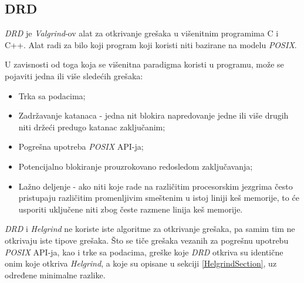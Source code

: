 \documentclass[12pt,oneside]{memoir}
\theoremstyle{plain}
\theoremstyle{definition}
\begin{document}
\subsection{DRD}
\textit{DRD} je \textit{Valgrind}-ov alat za otkrivanje grešaka u višenitnim programima C i C++. Alat radi za bilo koji program koji koristi niti bazirane na modelu \textit{POSIX}.

U zavisnosti od toga koja se višenitna paradigma koristi u programu, može se pojaviti jedna ili više sledećih grešaka:
\begin{itemize}
\item Trka sa podacima;
\item Zadržavanje katanaca - jedna nit blokira napredovanje jedne ili više drugih niti držeći predugo katanac zaključanim;
\item Pogrešna upotreba \textit{POSIX} API-ja;
\item Potencijalno blokiranje prouzrokovano redosledom zaključavanja;
\item Lažno deljenje - ako niti koje rade na različitim procesorskim jezgrima često pristupaju različitim promenljivim smeštenim u istoj liniji keš memorije, to će usporiti uključene niti zbog česte razmene linija keš memorije.
\end{itemize} 

\textit{DRD} i \textit{Helgrind} ne koriste iste algoritme za otkrivanje grešaka, pa samim tim ne otkrivaju iste tipove grešaka.
Što se tiče grešaka vezanih za pogrešnu upotrebu \textit{POSIX} API-ja, kao i trke sa podacima, greške koje \textit{DRD} otkriva su identične onim koje otkriva \textit{Helgrind}, a koje su opisane u sekciji \ref{HelgrindSection},  uz određene minimalne razlike.
\end{document}
